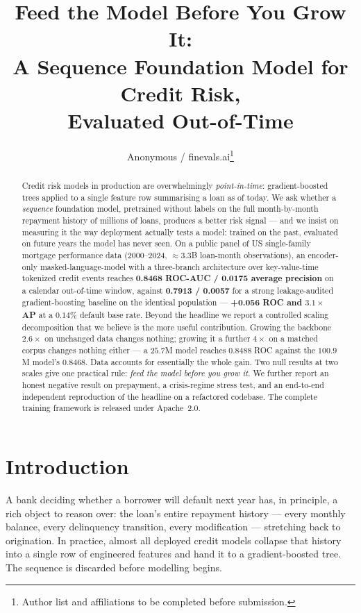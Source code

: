 \documentclass[10pt,letterpaper]{article}
\title{\textbf{Feed the Model Before You Grow It:\\
A Sequence Foundation Model for Credit Risk,\\
Evaluated Out-of-Time}}
\author{%
  Anonymous / finevals.ai\thanks{Author list and affiliations to be completed before submission.}
}
\date{}
\begin{document}
\maketitle

\begin{abstract}
Credit risk models in production are overwhelmingly \emph{point-in-time}: gradient-boosted trees
applied to a single feature row summarising a loan as of today. We ask whether a \emph{sequence}
foundation model, pretrained without labels on the full month-by-month repayment history of
millions of loans, produces a better risk signal --- and we insist on measuring it the way
deployment actually tests a model: trained on the past, evaluated on future years the model has
never seen. On a public panel of US single-family mortgage performance data (2000--2024,
$\approx$3.3B loan-month observations), an encoder-only masked-language-model with a three-branch
architecture over key-value-time tokenized credit events reaches \textbf{0.8468 ROC-AUC / 0.0175
average precision} on a calendar out-of-time window, against \textbf{0.7913 / 0.0057} for a
strong leakage-audited gradient-boosting baseline on the identical population --- \textbf{+0.056
ROC and $3.1\times$ AP} at a $0.14\%$ default base rate. Beyond the headline we report a
controlled scaling decomposition that we believe is the more useful contribution. Growing the
backbone $2.6\times$ on unchanged data changes nothing; growing it a further $4\times$ on a
matched corpus changes nothing either --- a $25.7$M model reaches $0.8488$ ROC against the $100.9$M
model's $0.8468$. Data accounts for essentially the whole gain. Two null results at two scales give
one practical rule: \emph{feed the model before you grow it}. We further report an honest negative result on
prepayment, a crisis-regime stress test, and an end-to-end independent reproduction of the
headline on a refactored codebase. The complete training framework is released under Apache~2.0.
\end{abstract}

\section{Introduction}
\label{sec:intro}

A bank deciding whether a borrower will default next year has, in principle, a rich object to
reason over: the loan's entire repayment history --- every monthly balance, every delinquency
transition, every modification --- stretching back to origination. In practice, almost all
deployed credit models collapse that history into a single row of engineered features and hand it
to a gradient-boosted tree. The sequence is discarded before modelling begins.
\end{document}
